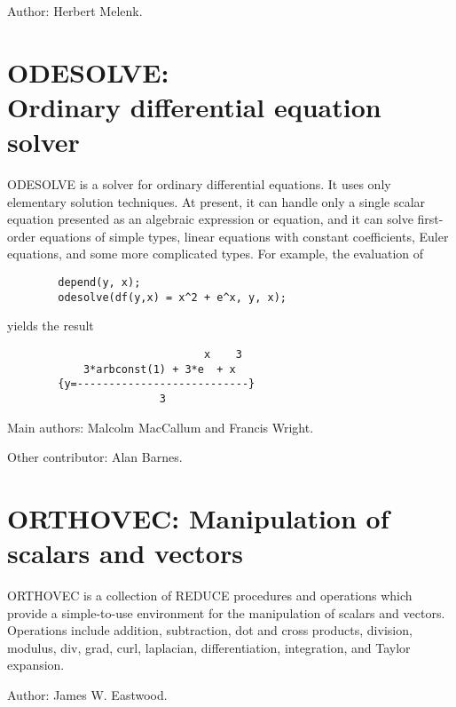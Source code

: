 Author: Herbert Melenk.



\newpage

\section[ODESOLVE: Ordinary differential equation solver]%
        {ODESOLVE: \protect\\ Ordinary differential equation solver}


ODESOLVE is a solver for ordinary differential equations.  It uses
only elementary solution techniques.  At present, it can handle only a
single scalar equation presented as an algebraic expression or
equation, and it can solve first-order equations of simple types,
linear equations with constant coefficients, Euler equations, and some
more complicated types.  For example, the evaluation of
\begin{verbatim}
        depend(y, x);
        odesolve(df(y,x) = x^2 + e^x, y, x);
\end{verbatim}
yields the result
\begin{verbatim}
                               x    3
            3*arbconst(1) + 3*e  + x
        {y=---------------------------}
                        3
\end{verbatim}

Main authors: Malcolm MacCallum and Francis Wright.

Other contributor: Alan Barnes.



\newpage


\section{ORTHOVEC: Manipulation of scalars and vectors}


ORTHOVEC is a collection of REDUCE procedures and operations which
provide a simple-to-use environment for the manipulation of scalars and
vectors.  Operations include addition, subtraction, dot and cross
products, division, modulus, div, grad, curl, laplacian, differentiation,
integration, and Taylor expansion.

Author: James W. Eastwood.



\newpage


